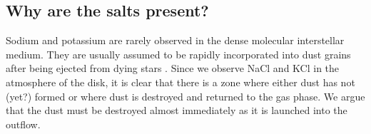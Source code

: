 \documentclass[twocolumn]{aastex62}
\begin{document}



%



\subsection{Why are the salts present?}

Sodium and potassium are rarely observed in the dense molecular interstellar
medium.  They are usually assumed to be rapidly incorporated into dust grains
after being ejected from dying stars \citep[e.g.,][]{Milam2007a}.  Since we
observe NaCl and KCl in the atmosphere of the disk, it is clear that
there is a zone where either dust has not (yet?) formed or
where dust is destroyed and returned to the gas phase.  We argue that
the dust must be destroyed almost immediately as it is launched into the outflow.

\end{document}
